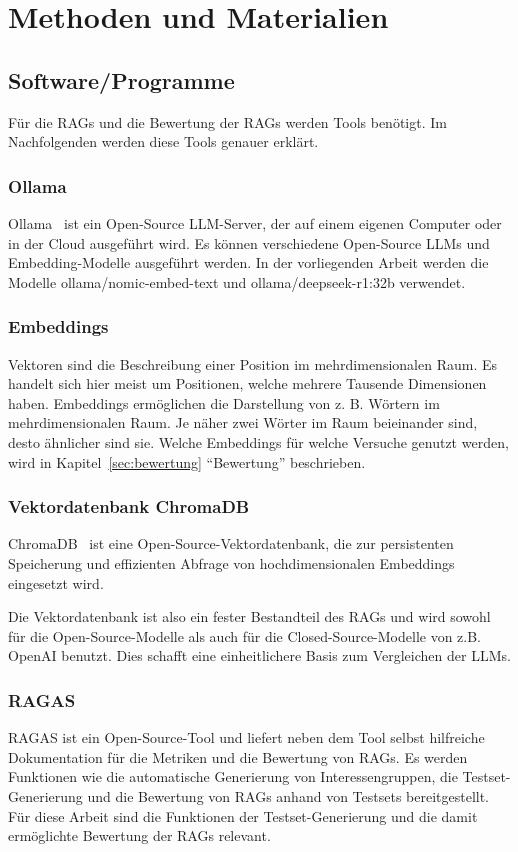 \chapter{Methoden und Materialien}

\section{Software/Programme}

Für die RAGs und die Bewertung der RAGs werden Tools benötigt. Im Nachfolgenden werden diese Tools genauer erklärt.

\subsection{Ollama}
Ollama~\cite{ollama_2025} ist ein Open-Source LLM-Server, der auf einem eigenen Computer oder in der Cloud ausgeführt wird.
Es können verschiedene Open-Source LLMs und Embedding-Modelle ausgeführt werden. In der vorliegenden Arbeit werden die Modelle ollama/nomic-embed-text und ollama/deepseek-r1:32b verwendet. 

\subsection{Embeddings}
Vektoren sind die Beschreibung einer Position im mehrdimensionalen Raum. Es handelt sich hier meist um Positionen, welche mehrere Tausende Dimensionen haben.
Embeddings ermöglichen die Darstellung von z. B. Wörtern im mehrdimensionalen Raum.
Je näher zwei Wörter im Raum beieinander sind, desto ähnlicher sind sie.
Welche Embeddings für welche Versuche genutzt werden, wird in Kapitel~\ref{sec:bewertung} \enquote{Bewertung} beschrieben.

\subsection{Vektordatenbank ChromaDB}
ChromaDB~\cite{trychroma_2025} ist eine Open-Source-Vektordatenbank, die zur persistenten Speicherung und effizienten Abfrage von hochdimensionalen Embeddings eingesetzt wird.

Die Vektordatenbank ist also ein fester Bestandteil des RAGs und wird sowohl für die Open-Source-Modelle als auch für die Closed-Source-Modelle von z.B. OpenAI benutzt. Dies schafft eine einheitlichere Basis zum Vergleichen der LLMs.

\subsection{RAGAS}
RAGAS ist ein Open-Source-Tool und liefert neben dem Tool selbst hilfreiche Dokumentation für die Metriken und die Bewertung von RAGs.
Es werden Funktionen wie die automatische Generierung von Interessengruppen, die Testset-Generierung und die Bewertung von RAGs anhand von Testsets bereitgestellt.
Für diese Arbeit sind die Funktionen der Testset-Generierung und die damit ermöglichte Bewertung der RAGs relevant.

